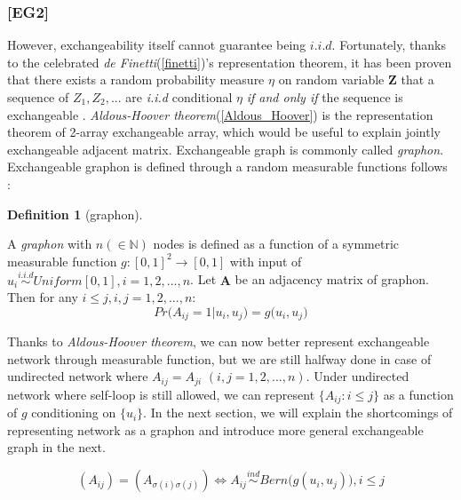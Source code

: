 \documentclass[12pt]{article}
\theoremstyle{definition}
\newtheorem{definition}{Definition}[section]
\begin{document}
\subsubsection{[EG2]}

However, exchangeability itself cannot guarantee being $i.i.d$. Fortunately, thanks to the celebrated  \textit{de Finetti}(\ref{finetti})'s representation theorem, it has been proven that there exists a random probability measure $\eta$ on random variable $\mathbf{Z}$ that a sequence of $Z_{1}, Z_{2}, ... $ are \textit{i.i.d} conditional $\eta$ \textit{if and only if} the sequence is exchangeable \cite{Orbanz} \cite{Caron}. \textit{Aldous-Hoover theorem}(\ref{Aldous_Hoover}) is the representation theorem of 2-array exchangeable array, which would be useful to explain jointly exchangeable adjacent matrix. Exchangeable graph is commonly called \textit{graphon}. Exchangeable graphon is defined through a random measurable functions follows \cite{Chan}:

\begin{definition}[graphon]
	\label{graphon}
	
	A \textit{graphon} with $n (\in \mathbb{N})$ nodes is defined as a function of a symmetric measurable function $g : [0,1]^2 \rightarrow [0,1]$ with input of $u_{i} \overset{i.i.d}{\sim} Uniform[0,1], i = 1,2,... ,n$. 
	Let $\mathbf{A}$ be an adjacency matrix of graphon. Then for any $i \leq j, i,j=1,2,...,n$:	
	\begin{equation}
	Pr \big(   A_{ij} = 1 \big| u_{i}, u_{j} \big) = g \big(  u_{i}, u_{j} \big)
	\end{equation}
	
\end{definition}

Thanks to \textit{Aldous-Hoover theorem}, we can now better represent exchangeable network through measurable function, but we are still halfway done in case of undirected network where $A_{ij} = A_{ji}$  $(i,j=1,2,... , n)$.  Under undirected network where self-loop is still allowed, we can represent $\{ A_{ij} : i \leq j \}$ as a function of $g$ conditioning on $\{ u_{i}\}$. 
In the next section, we will explain the shortcomings of representing network as a graphon and introduce more general exchangeable graph in the next. 

\begin{equation}
( A_{ij} )  =  (   A_{\sigma(i) \sigma(j)}  ) \Longleftrightarrow A_{ij} \overset{ind}{\sim} Bern\big(  g(u_{i}, u_{j}) \big), i \leq j
\end{equation}  
\end{document}
